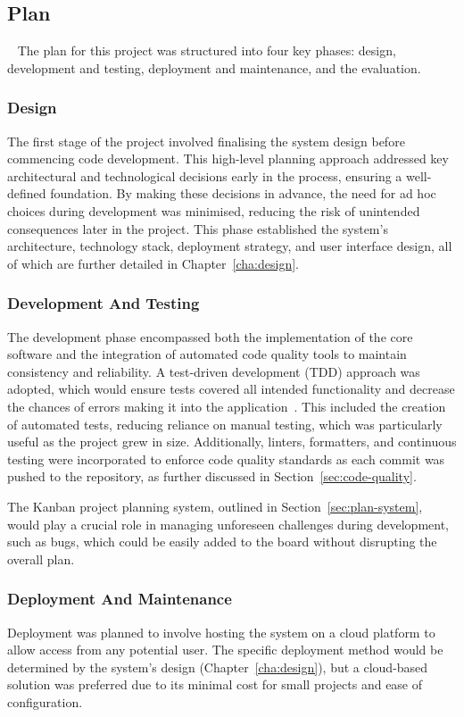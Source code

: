 \subsection{Plan}~\label{sec:plan}
The plan for this project was structured into four key phases: design, development and testing, deployment and maintenance, and the evaluation.

\subsubsection{Design}
The first stage of the project involved finalising the system design before commencing code development. This high-level planning approach addressed key architectural and technological decisions early in the process, ensuring a well-defined foundation. By making these decisions in advance, the need for ad hoc choices during development was minimised, reducing the risk of unintended consequences later in the project. This phase established the system's architecture, technology stack, deployment strategy, and user interface design, all of which are further detailed in Chapter~\ref{cha:design}.

\subsubsection{Development And Testing}
The development phase encompassed both the implementation of the core software and the integration of automated code quality tools to maintain consistency and reliability. A test-driven development (TDD) approach was adopted, which would ensure tests covered all intended functionality and decrease the chances of errors making it into the application~\cite{10.1145/952532.952753}. This included the creation of automated tests, reducing reliance on manual testing, which was particularly useful as the project grew in size. Additionally, linters, formatters, and continuous testing were incorporated to enforce code quality standards as each commit was pushed to the repository, as further discussed in Section~\ref{sec:code-quality}.

The Kanban project planning system, outlined in Section~\ref{sec:plan-system}, would play a crucial role in managing unforeseen challenges during development, such as bugs, which could be easily added to the board without disrupting the overall plan.

\subsubsection{Deployment And Maintenance}
Deployment was planned to involve hosting the system on a cloud platform to allow access from any potential user. The specific deployment method would be determined by the system’s design (Chapter~\ref{cha:design}), but a cloud-based solution was preferred due to its minimal cost for small projects and ease of configuration.

